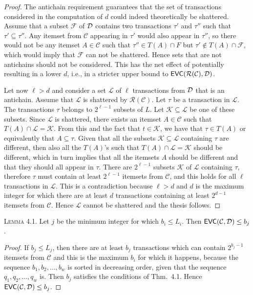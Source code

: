 \documentclass[twoside,leqno,twocolumn]{article}
\def\Ds{{\cal D}}
\def\EVC{\mathsf{EVC}}
\def\range{\mathcal{R}}
\def\eb{\mathsf{eb}}
\begin{document}
\begin{proof}
  The antichain requirement guarantees that the set of transactions considered in
  the computation of $d$ could indeed theoretically be shattered. Assume that a
  subset $\mathcal{F}$ of $\Ds$ contains two transactions $\tau'$ and $\tau''$
  such that $\tau'\subseteq\tau''$. Any itemset from $\mathcal{C}$
  appearing in $\tau'$ would also appear in $\tau''$, so there would not be any
  itemset $A\in\mathcal{C}$ such that $\tau''\in T(A)\cap F$ but
  $\tau'\not\in T(A)\cap \mathcal{F}$, which would imply that $\mathcal{F}$ can
  not be shattered. Hence sets that are not antichains should not be
  considered. This has the net effect of potentially resulting in a lower $d$,
  i.e., in a stricter upper bound to $\EVC(\range(\mathcal{C}),\Ds)$.

  Let now $\ell>d$ and consider a set $\mathcal{L}$ of $\ell$ transactions from
  $\Ds$ that is an antichain. Assume that $\mathcal{L}$ is shattered by
  $\range(\mathcal{C})$. Let $\tau$ be a transaction in $\mathcal{L}$.
  The transactions $\tau$ belongs to $2^{\ell-1}$ subsets of $L$. Let
  $\mathcal{K}\subseteq \mathcal{L}$ be one of these subsets. Since
  $\mathcal{L}$ is shattered, there exists an itemset $A\in\mathcal{C}$ such
  that $T(A)\cap \mathcal{L}=\mathcal{K}$. From this and the fact
  that $t\in \mathcal{K}$, we have that $\tau\in T(A)$ or equivalently that
  $A\subseteq\tau$. Given that all the subsets $\mathcal{K}\subseteq\mathcal{L}$
  containing $\tau$ are different, then also all the $T(A)$'s such that
  $T(A)\cap \mathcal{L}=\mathcal{K}$ should be
  different, which in turn implies that all the itemsets
  $A$ should be different and that they should all appear in $\tau$. There are
  $2^{\ell-1}$ subsets $\mathcal{K}$ of $\mathcal{L}$ containing $\tau$,
  therefore $\tau$ must contain at least $2^{\ell-1}$ itemsets from
  $\mathcal{C}$, and this holds for all $\ell$ transactions in $\mathcal{L}$. This is a
  contradiction because $\ell>d$ and $d$ is the
  maximum integer for which there are at least $d$ transactions containing at
  least $2^{d-1}$ itemsets from $\mathcal{C}$. Hence $\mathcal{L}$ cannot be shattered and
  the thesis follows.
\end{proof}

\textsc{Lemma 4.1.} Let $j$ be the minimum integer for which $b_i\le L_i$. Then
  $\EVC(\mathcal{C},\Ds)\le b_j$. %

\begin{proof}
  If $b_j\le L_j$, then there are at least $b_j$ transactions which can contain
  $2^{b_j-1}$ itemsets from $\mathcal{C}$ and this is the maximum $b_i$ for
  which it happens, because the sequence $b_1,b_2,\dotsc,b_w$ is sorted in
  decreasing order, given that the sequence $q_1,q_2,\dotsc,q_w$ is. Then $b_j$
  satisfies the conditions of Thm.~4.1. Hence
  $\EVC(\mathcal{C},\Ds)\le b_j$.
\end{proof}
\end{document}
